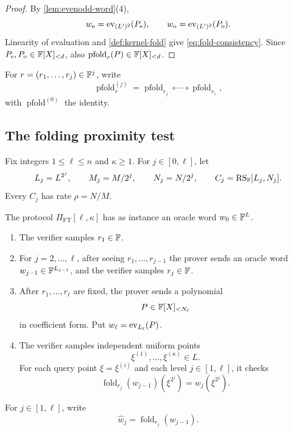 \begin{proof}
By \cref{lem:evenodd-word}(4),
\[
  w_{\mathrm e}=\operatorname{ev}_{(L')^2}(P_{\mathrm e}),
  \qquad
  w_{\mathrm o}=\operatorname{ev}_{(L')^2}(P_{\mathrm o}).
\]
Linearity of evaluation and \cref{def:kernel-fold} give \eqref{eq:fold-consistency}.  Since $P_{\mathrm e},P_{\mathrm o}\in\mathbb{F}[X]_{<d}$, also $\operatorname{pfold}_r(P)\in\mathbb{F}[X]_{<d}$.
\end{proof}

For $r=(r_1,\ldots,r_j)\in\mathbb{F}^j$, write
\[
  \operatorname{pfold}^{(j)}_r
  =
  \operatorname{pfold}_{r_j}\circ\cdots\circ\operatorname{pfold}_{r_1},
\]
with $\operatorname{pfold}^{(0)}$ the identity.

\subsection{The folding proximity test}
\label{sec:folding-test}

Fix integers $1\le\ell\le n$ and $\kappa\ge1$.  For $j\in[0,\ell]$, let
\[
  L_j=L^{2^j},
  \qquad
  M_j=M/2^j,
  \qquad
  N_j=N/2^j,
  \qquad
  C_j=\operatorname{RS}_{\mathbb{F}}[L_j,N_j].
\]
Every $C_j$ has rate $\rho=N/M$.

\begin{definition}
\label{def:folding-test}
The protocol $\Pi_{\mathrm{FT}}[\ell,\kappa]$ has as instance an oracle word $w_0\in\mathbb{F}^L$.
\begin{enumerate}[label=\textnormal{\arabic*.},leftmargin=*]
  \item The verifier samples $r_1\in\mathbb{F}$.
  \item For $j=2,\ldots,\ell$, after seeing $r_1,\ldots,r_{j-1}$ the prover sends an oracle word $w_{j-1}\in\mathbb{F}^{L_{j-1}}$, and the verifier samples $r_j\in\mathbb{F}$.
  \item After $r_1,\ldots,r_\ell$ are fixed, the prover sends a polynomial
  \[
    P\in\mathbb{F}[X]_{<N_\ell}
  \]
  in coefficient form.  Put $w_\ell=\operatorname{ev}_{L_\ell}(P)$.
  \item The verifier samples independent uniform points
  \[
    \xi^{(1)},\ldots,\xi^{(\kappa)}\in L.
  \]
  For each query point $\xi=\xi^{(i)}$ and each level $j\in[1,\ell]$, it checks
  \begin{equation}
    \operatorname{fold}_{r_j}(w_{j-1})(\xi^{2^j})
    =
    w_j(\xi^{2^j}).
    \label{eq:fold-check}
  \end{equation}
\end{enumerate}
For $j\in[1,\ell]$, write
\[
  \widehat w_j=\operatorname{fold}_{r_j}(w_{j-1}).
\]
\end{definition}

